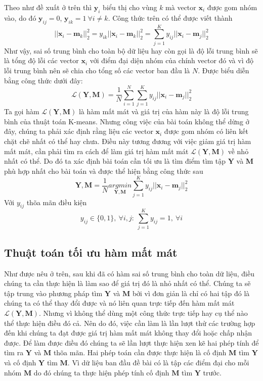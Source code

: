 \documentclass{article}
\begin{document}
	Theo như đề xuất ở trên thì $\mathbf{y}_i$ biểu thị cho vùng $k$ mà vector $\mathbf{x}_i$ được gom nhóm vào, do đó $\mathbf{y}_{ij} = 0$, $\mathbf{y}_{ik} = 1\ \forall i\neq k$. Công thức trên có thể được viết thành
	$$||\mathbf{x}_i-\mathbf{m}_k||^2_2 = y_{ik}||\mathbf{x}_i-\mathbf{m}_k||^2_2 = \sum_{j = 1}^K y_{ij}||\mathbf{x}_i-\mathbf{m}_j||^2_2$$
	Như vậy, sai số trung bình cho toàn bộ dữ liệu hay còn gọi là độ lỗi trung bình sẽ là tổng độ lỗi các vector $\mathbf{x}_i$ với điểm đại diện nhóm của chính vector đó và vì độ lỗi trung bình nên sẽ chia cho tổng số các vector ban đầu là $N$. Được biểu diễn bằng công thức dưới đây:
	$$\mathcal{L}(\mathbf{Y},\mathbf{M}) = \frac{1}{N}\sum_{i = 1}^{N}\sum_{j = 1}^{K}y_{ij}||\mathbf{x}_i-\mathbf{m}_j||^2_2$$
	Ta gọi hàm $\mathcal{L}(\mathbf{Y},\mathbf{M})$ là hàm mất mát và giá trị của hàm này là độ lỗi trung bình của thuật toán K-means. Nhưng công việc của bài toán không thể dừng ở đây, chúng ta phải xác định rằng liệu các vector $\mathbf{x}_i$ được gom nhóm có liên kết chặt chẽ nhất có thể hay chưa. Điều này tương đương với việc giảm giá trị hàm mất mát, cần phải tìm ra cách để làm giá trị hàm mất mát $\mathcal{L}(\mathbf{Y},\mathbf{M})$ về nhỏ nhất có thể. Do đó ta xác định bài toán cần tối ưu là tìm điểm tìm tập $\mathbf{Y}$ và $\mathbf{M}$ phù hợp nhất cho bài toán và được thể hiện bằng công thức sau
	\[
	\mathbf{Y},\mathbf{M} = \frac{1}{N} \underset{\mathbf{Y},\mathbf{M}}{argmin}\sum_{j = 1}^{K}y_{ij}||\mathbf{x}_i-\mathbf{m}_j||^2_2
	\]
	Với $y_{ij}$ thõa mãn điều kiện
	\[
	y_{ij} \in \{0,1\},\ \forall i,j:\ \sum_{j = 1}^{K} y_{ij}= 1,\  \forall i
	\]
	
	\subsection{Thuật toán tối ưu hàm mất mát}
	Như được nêu ở trên, sau khi đã có hàm sai số trung bình cho toàn dữ liệu, điều chúng ta cần thực hiện là làm sao để giá trị đó là nhỏ nhất có thể. Chúng ta sẽ tập trung vào phương pháp tìm $\mathbf{Y}$ và $\mathbf{M}$ bởi vì đơn giản là chỉ có hai tập đó là chúng ta có thể thay đổi được và nó liên quan trực tiếp đến hàm mất mát$\mathcal{L}(\mathbf{Y},\mathbf{M})$. Nhưng vì không thể dùng một công thức trực tiếp hay cụ thể nào thể thực hiện điều đó cả. Nên do đó, việc cần làm là lần lượt thử các trường hợp đến khi chúng ta đạt được giá trị hàm mất mát không thay đổi hoặc chấp nhận được. Để làm được điều đó chúng ta sẽ lần lượt thực hiện xen kẽ hai phép tính để tìm ra $\mathbf{Y}$ và $\mathbf{M}$ thõa mãn. Hai phép toán cần được thực hiện là cố định $\mathbf{M}$ tìm $\mathbf{Y}$ và cố định $\mathbf{Y}$ tìm $\mathbf{M}$. Vì dữ liệu ban đầu đề bài có là tập các điểm đại cho mỗi nhóm $\mathbf{M}$ do đó chúng ta thực hiện phép tính cố định $\mathbf{M}$ tìm $\mathbf{Y}$ trước.
\end{document}
